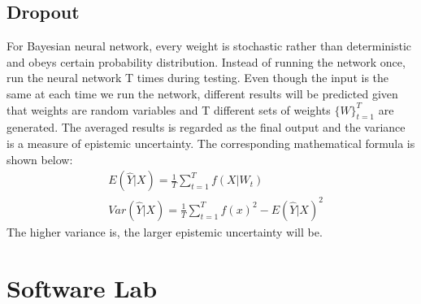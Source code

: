 \documentclass[11pt]{article} %
\begin{document}
	\subsection{Dropout}
	For Bayesian neural network, every weight is stochastic rather than deterministic and obeys certain probability distribution. Instead of running the network once, run the neural network T times during testing. Even though the input is the same at each time we run the network, different results will be predicted given that weights are random variables and T different sets of weights $ \{W\}^T_{t=1}$ are generated. The averaged results is regarded as the final output and the variance is a measure of epistemic uncertainty. The corresponding mathematical formula is shown below:
	\begin{align*}
		&E(\hat{Y}|X)=\frac{1}{T} \sum_{t=1}^T f(X|W_t) \\
	    &Var(\hat{Y}|X)=\frac{1}{T} \sum_{t=1}^T f(x)^2-E(\hat{Y}|X)^2
    \end{align*}
	The higher variance is, the larger epistemic uncertainty will be.
	
	\section{Software Lab}

	
	
	
	
	
\end{document}
